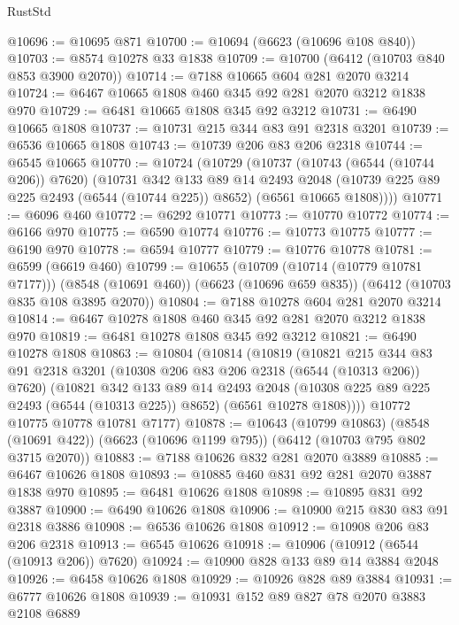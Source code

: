 \begin{lexlean}{RustStd}
\begin{coremodule}
@10696 := @10695 @871
@10700 := @10694 (@6623 (@10696 @108 @840))
@10703 := @8574 @10278 @33 @1838
@10709 := @10700 (@6412 (@10703 @840 @853 @3900 @2070))
@10714 := @7188 @10665 @604 @281 @2070 @3214
@10724 := @6467 @10665 @1808 @460 @345 @92 @281 @2070 @3212 @1838 @970
@10729 := @6481 @10665 @1808 @345 @92 @3212
@10731 := @6490 @10665 @1808
@10737 := @10731 @215 @344 @83 @91 @2318 @3201
@10739 := @6536 @10665 @1808
@10743 := @10739 @206 @83 @206 @2318
@10744 := @6545 @10665
@10770 := @10724
    (@10729
      (@10737
        (@10743 (@6544 (@10744 @206)) @7620)
        (@10731
          @342
          @133
          @89
          @14
          @2493
          @2048
          (@10739 @225 @89 @225 @2493 (@6544 (@10744 @225)) @8652)
          (@6561 @10665 @1808))))
@10771 := @6096 @460
@10772 := @6292 @10771
@10773 := @10770 @10772
@10774 := @6166 @970
@10775 := @6590 @10774
@10776 := @10773 @10775
@10777 := @6190 @970
@10778 := @6594 @10777
@10779 := @10776 @10778
@10781 := @6599 (@6619 @460)
@10799 := @10655
    (@10709 (@10714 (@10779 @10781 @7177)))
    (@8548 (@10691 @460))
    (@6623 (@10696 @659 @835))
    (@6412 (@10703 @835 @108 @3895 @2070))
@10804 := @7188 @10278 @604 @281 @2070 @3214
@10814 := @6467 @10278 @1808 @460 @345 @92 @281 @2070 @3212 @1838 @970
@10819 := @6481 @10278 @1808 @345 @92 @3212
@10821 := @6490 @10278 @1808
@10863 := @10804
    (@10814
      (@10819
        (@10821
          @215
          @344
          @83
          @91
          @2318
          @3201
          (@10308 @206 @83 @206 @2318 (@6544 (@10313 @206)) @7620)
          (@10821
            @342
            @133
            @89
            @14
            @2493
            @2048
            (@10308 @225 @89 @225 @2493 (@6544 (@10313 @225)) @8652)
            (@6561 @10278 @1808))))
      @10772
      @10775
      @10778
      @10781
      @7177)
@10878 := @10643
    (@10799 @10863)
    (@8548 (@10691 @422))
    (@6623 (@10696 @1199 @795))
    (@6412 (@10703 @795 @802 @3715 @2070))
@10883 := @7188 @10626 @832 @281 @2070 @3889
@10885 := @6467 @10626 @1808
@10893 := @10885 @460 @831 @92 @281 @2070 @3887 @1838 @970
@10895 := @6481 @10626 @1808
@10898 := @10895 @831 @92 @3887
@10900 := @6490 @10626 @1808
@10906 := @10900 @215 @830 @83 @91 @2318 @3886
@10908 := @6536 @10626 @1808
@10912 := @10908 @206 @83 @206 @2318
@10913 := @6545 @10626
@10918 := @10906 (@10912 (@6544 (@10913 @206)) @7620)
@10924 := @10900 @828 @133 @89 @14 @3884 @2048
@10926 := @6458 @10626 @1808
@10929 := @10926 @828 @89 @3884
@10931 := @6777 @10626 @1808
@10939 := @10931 @152 @89 @827 @78 @2070 @3883 @2108 @6889

\end{coremodule}
\end{lexlean}
